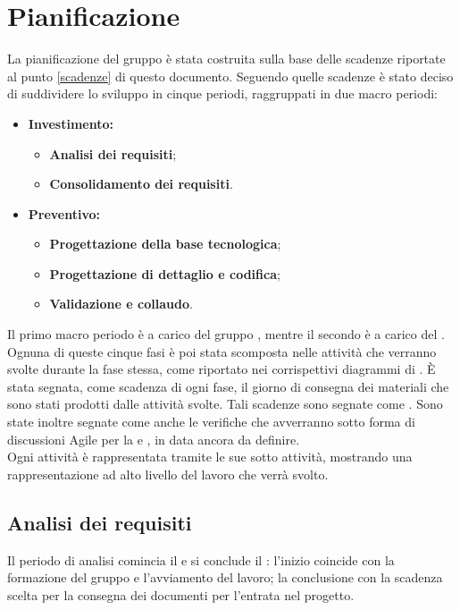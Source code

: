 \documentclass[PianoDiProgetto.tex]{subfiles}
\begin{document}
\chapter{Pianificazione}
La pianificazione del gruppo \gruppo è stata costruita sulla base delle scadenze riportate al punto \ref{scadenze} di questo documento. Seguendo quelle scadenze è stato deciso di suddividere lo sviluppo in cinque periodi, raggruppati in due macro periodi:
\begin{itemize}
	\item \textbf{Investimento:}
		\begin{itemize}
			\item \textbf{Analisi dei requisiti};
			\item \textbf{Consolidamento dei requisiti}.
		\end{itemize}
	\item \textbf{Preventivo:}
		\begin{itemize}
			\item \textbf{Progettazione della base tecnologica};
			\item \textbf{Progettazione di dettaglio e codifica};
			\item \textbf{Validazione e collaudo}.
		\end{itemize}
\end{itemize}
Il primo macro periodo è a carico del gruppo \gruppo, mentre il secondo è a carico del .\\
Ognuna di queste cinque fasi è poi stata scomposta nelle attività che verranno svolte durante la fase stessa, come riportato nei corrispettivi diagrammi di . \`{E} stata segnata, come scadenza di ogni fase, il giorno di consegna dei materiali che sono stati prodotti dalle attività svolte. Tali scadenze sono segnate come .
Sono state inoltre segnate come  anche le verifiche che avverranno sotto forma di discussioni Agile per la \tb e \pb, in data ancora da definire.\\ Ogni attività è rappresentata tramite le sue sotto attività, mostrando una rappresentazione ad alto livello del lavoro che verrà svolto.
\newpage

\section{Analisi dei requisiti}
Il periodo di analisi comincia il  e si conclude il : l'inizio coincide con la formazione del gruppo e l'avviamento del lavoro; la conclusione con la scadenza scelta per la consegna dei documenti per l'entrata nel progetto.
\end{document}
